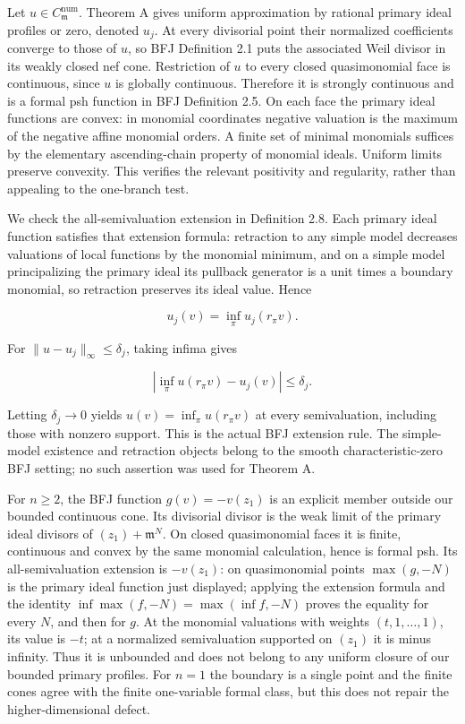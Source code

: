 \documentclass[11pt]{article}
\begin{document}
Let \(u\in C^{\mathrm{num}}_{\mathfrak m}\). Theorem A gives uniform approximation by rational primary ideal profiles or zero, denoted \(u_j\). At every divisorial point their normalized coefficients converge to those of \(u\), so BFJ Definition 2.1 puts the associated Weil divisor in its weakly closed nef cone. Restriction of \(u\) to every closed quasimonomial face is continuous, since \(u\) is globally continuous. Therefore it is strongly continuous and is a formal psh function in BFJ Definition 2.5. On each face the primary ideal functions are convex: in monomial coordinates negative valuation is the maximum of the negative affine monomial orders. A finite set of minimal monomials suffices by the elementary ascending-chain property of monomial ideals. Uniform limits preserve convexity. This verifies the relevant positivity and regularity, rather than appealing to the one-branch test.

We check the all-semivaluation extension in Definition 2.8. Each primary ideal function satisfies that extension formula: retraction to any simple model decreases valuations of local functions by the monomial minimum, and on a simple model principalizing the primary ideal its pullback generator is a unit times a boundary monomial, so retraction preserves its ideal value. Hence

\[
u_j(v)=\inf_\pi u_j(r_\pi v).
\]

For \(\|u-u_j\|_\infty\leq\delta_j\), taking infima gives

\[
\left|\inf_\pi u(r_\pi v)-u_j(v)\right|\leq\delta_j.
\]

Letting \(\delta_j\to0\) yields \(u(v)=\inf_\pi u(r_\pi v)\) at every semivaluation, including those with nonzero support. This is the actual BFJ extension rule. The simple-model existence and retraction objects belong to the smooth characteristic-zero BFJ setting; no such assertion was used for Theorem A.

For \(n\geq2\), the BFJ function \(g(v)=-v(z_1)\) is an explicit member outside our bounded continuous cone. Its divisorial divisor is the weak limit of the primary ideal divisors of \((z_1)+\mathfrak m^N\). On closed quasimonomial faces it is finite, continuous and convex by the same monomial calculation, hence is formal psh. Its all-semivaluation extension is \(-v(z_1)\): on quasimonomial points \(\max(g,-N)\) is the primary ideal function just displayed; applying the extension formula and the identity \(\inf\max(f,-N)=\max(\inf f,-N)\) proves the equality for every \(N\), and then for \(g\). At the monomial valuations with weights \((t,1,\ldots,1)\), its value is \(-t\); at a normalized semivaluation supported on \((z_1)\) it is minus infinity. Thus it is unbounded and does not belong to any uniform closure of our bounded primary profiles. For \(n=1\) the boundary is a single point and the finite cones agree with the finite one-variable formal class, but this does not repair the higher-dimensional defect.
\end{document}
